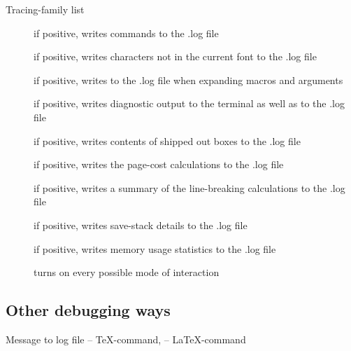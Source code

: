 \begin{frame}{Tracing-family list}\relax
\footnotesize

\begin{description}
    \item[\ccol\tracingcommands] if positive, writes commands to the .log file
    \item[\ccol\tracinglostchars] if positive, writes characters not in the current font to the .log file
    \item[\ccol\tracingmacros] if positive, writes to the .log file when expanding macros and arguments
    \item[\ccol\tracingonline] if positive, writes diagnostic output to the terminal as well as to the .log file
    \item[\ccol\tracingoutput] if positive, writes contents of shipped out boxes to the .log file
    \item[\ccol\tracingpages] if positive, writes the page-cost calculations to the .log file
    \item[\ccol\tracingparagraphs] if positive, writes a summary of the line-breaking calculations to the .log file
    \item[\ccol\tracingrestores] if positive, writes save-stack details to the .log file
    \item[\ccol\tracingstats] if positive, writes memory usage statistics to the .log file
    \item[\ccol\tracingall] turns on every possible mode of interaction
\end{description}
\end{frame}

\subsection{Other debugging ways}

\begin{frame}[fragile]{Message to log file\magicPage}\relax
{}
 -- \TeX-command,  -- \LaTeX-command

\end{frame}

% 